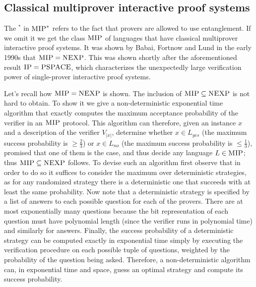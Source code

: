 \subsection{Classical multiprover interactive proof systems}

The $^*$ in $\textsc{MIP}^*$ refers to the fact that provers are allowed to use entanglement. If we omit it we get the class $\textsc{MIP}$ of languages that have classical multiprover interactive proof systems. It was shown by Babai, Fortnow and Lund in the early 1990s that $\textsc{MIP} =  \textsc{NEXP}$. This was shown shortly after the aforementioned result $\textsc{IP} = \textsc{PSPACE}$, which characterizes the unexpectedly large verification power of single-prover interactive proof systems.  

Let's recall how $\textsc{MIP} = \textsc{NEXP}$ is shown. 
 The inclusion of $\textsc{MIP} \subseteq \textsc{NEXP}$ is not hard to obtain. To show it we give a non-deterministic exponential time algorithm that exactly computes the maximum acceptance probability of the verifier in an $\textsc{MIP}$ protocol. This algorithm can therefore, given an instance $x$ and a description of the verifier $V_{|x|}$, determine whether $x\in L_{yes}$ (the maximum success probability is $\geq \frac{2}{3}$) or $x\in L_{no}$ (the maximum success probability is $\leq \frac{1}{3}$), promised that one of them is the case, and thus decide any language $L\in \textsc{MIP}$; thus $\textsc{MIP}\subseteq \textsc{NEXP}$ follows. To devise such an algorithm first observe that in order to do so it suffices to consider the maximum over deterministic strategies, as for any randomized strategy there is a deterministic one that succeeds with at least the same probability. Now note that a deterministic strategy is specified by a list of answers to each possible question for each of the provers. There are at most exponentially many questions because the bit representation of each question must have polynomial length (since the verifier runs in polynomial time) and similarly for answers. Finally, the success probability of a deterministic strategy can be computed exactly in exponential time simply by executing the verification procedure on each possible tuple of questions, weighted by the probability of the question being asked. Therefore, a non-deterministic algorithm can, in exponential time and space, guess an optimal strategy and compute its success probability. 

